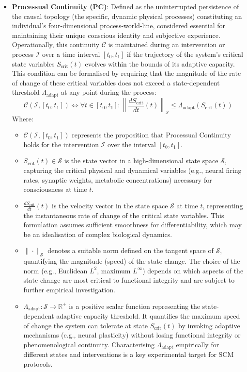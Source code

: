 \documentclass[10pt]{article}
\begin{document}
\begin{sloppypar}
\begin{itemize}
    \item \textbf{Processual Continuity (PC)}: Defined as the uninterrupted persistence of the causal topology (the specific, dynamic physical processes) constituting an individual’s four-dimensional process-world-line, considered essential for maintaining their unique conscious identity and subjective experience. Operationally, this continuity \( \mathcal{C} \) is maintained during an intervention or process \( \mathcal{I} \) over a time interval \( [t_0, t_1] \) if the trajectory of the system’s critical state variables \( S_{\text{crit}}(t) \) evolves within the bounds of its adaptive capacity. This condition can be formalised by requiring that the magnitude of the rate of change of these critical variables does not exceed a state-dependent threshold \( \Lambda_{\text{adapt}} \) at any point during the process:
          \begin{equation}
            \mathcal{C}(\mathcal{I}, [t_0, t_1]) \iff \forall t \in [t_0, t_1] : \left\| \frac{dS_{\text{crit}}}{dt}(t) \right\|_{\mathcal{S}} \le \Lambda_{\text{adapt}}(S_{\text{crit}}(t))
            \label{eq:continuity}
          \end{equation}
          Where:
          \begin{itemize}
            \item \( \mathcal{C}(\mathcal{I}, [t_0, t_1]) \) represents the proposition that Processual Continuity holds for the intervention \( \mathcal{I} \) over the interval \( [t_0, t_1] \).
            \item \( S_{\text{crit}}(t) \in \mathcal{S} \) is the state vector in a high-dimensional state space \( \mathcal{S} \), capturing the critical physical and dynamical variables (e.g., neural firing rates, synaptic weights, metabolic concentrations) necessary for consciousness at time \( t \).
            \item \( \frac{dS_{\text{crit}}}{dt}(t) \) is the velocity vector in the state space \( \mathcal{S} \) at time \( t \), representing the instantaneous rate of change of the critical state variables. This formulation assumes sufficient smoothness for differentiability, which may be an idealisation of complex biological dynamics.
            \item \( \| \cdot \|_{\mathcal{S}} \) denotes a suitable norm defined on the tangent space of \( \mathcal{S} \), quantifying the magnitude (speed) of the state change. The choice of the norm (e.g., Euclidean \( L^2 \), maximum \( L^\infty \)) depends on which aspects of the state change are most critical to functional integrity and are subject to further empirical investigation.
            \item \( \Lambda_{\text{adapt}}: \mathcal{S} \to \mathbb{R}^+ \) is a positive scalar function representing the state-dependent adaptive capacity threshold. It quantifies the maximum speed of change the system can tolerate at state \( S_{\text{crit}}(t) \) by invoking adaptive mechanisms (e.g., neural plasticity) without losing functional integrity or phenomenological continuity. Characterising \( \Lambda_{\text{adapt}} \) empirically for different states and interventions is a key experimental target for SCM protocols.


\end{itemize}
\end{itemize}
\end{sloppypar}
\end{document}
